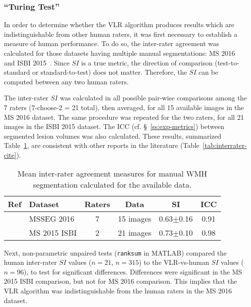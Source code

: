 \subsubsection{``Turing Test''}\label{sss:exp-turing}
In order to determine whether the VLR algorithm produces results which are indistinguishable
from other human raters, it was first necessary to establish a measure of human performance.
To do so, the inter-rater agreement was calculated for those datasets
having multiple manual segmentations: MS 2016~\cite{MSSEG2016} and ISBI 2015~\cite{MSISBI2015}.
Since $SI$ is a true metric,
the direction of comparison (test-to-standard or standard-to-test) does not matter.
Therefore, the $SI$ can be computed between any two human raters.
\par
The inter-rater $SI$ was calculated in all possible pair-wise comparisons among the 7 raters
(7-choose-2 = 21 total), then averaged, for all 15 available images in the MS 2016 dataset.
The same procedure was repeated for the two raters, for all 21 images in the ISBI 2015 dataset.
The ICC (cf. \S~\ref{ss:exp-metrics}) between segmented lesion volumes was also calculated.
These results, summarized Table~\ref{tab:interrater-inhouse},
are consistent with other reports in the literature (Table~\ref{tab:interrater-cite}).
\par
\begin{table}
  \centering
  \caption{Mean inter-rater agreement measures
    for manual WMH segmentation calculated for the available data.}%
  \label{tab:interrater-inhouse}
  \begin{tabular}{clcccc}
    \toprule
    Ref & Dataset & Raters & Data & SI & ICC \\
    \midrule
    \cite{MSSEG2016}  & MSSEG 2016   &  7  & 15 images & 0.63$\pm$0.16 & 0.91 \\ %
    \cite{MSISBI2015} & MS 2015 ISBI &  2  & 21 images & 0.73$\pm$0.10 & 0.98 \\ %
    \bottomrule
  \end{tabular}
\end{table}
Next, non-parametric unpaired tests (\texttt{ranksum} in MATLAB) compared
the human inter-rater $SI$ values ($n=21$, $n=315$)
to the VLR-vs-human $SI$ values ($n=96$),
to test for significant differences.
Differences were significant in the MS 2015 ISBI comparison,
but not for MS 2016 comparison.
This implies that the VLR algorithm was indistinguishable from the human raters
in the MS 2016 dataset.
